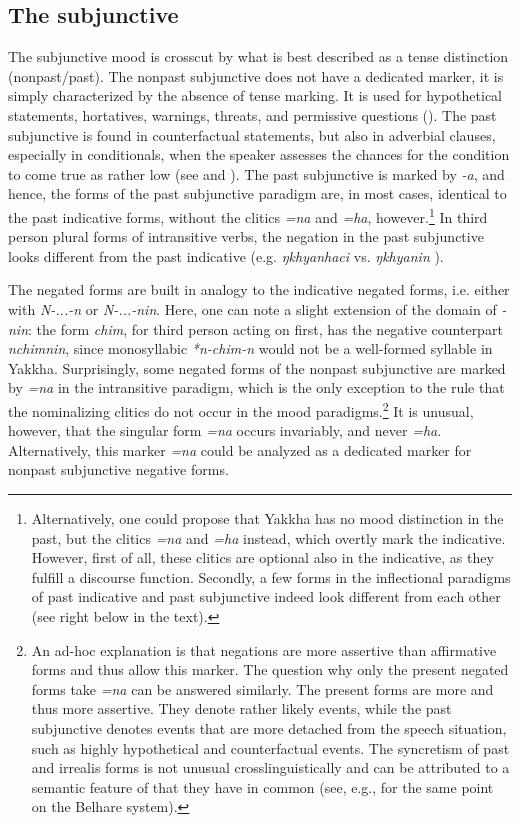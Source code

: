 \subsection{The subjunctive}

The subjunctive mood is crosscut by what is best described as a tense distinction (nonpast/past). The nonpast subjunctive does not have a dedicated marker, it is simply characterized by the absence of tense marking. It is used for hypothetical statements, hortatives, warnings, threats, and permissive questions (). The past subjunctive is found in counterfactual statements, but also in adverbial clauses, especially in conditionals, when the speaker assesses the chances for the condition to come true as rather low (see  and ). The past subjunctive is marked by \emph{-a}, and hence, the forms of the past subjunctive paradigm are, in most cases, identical to the past indicative forms, without the clitics \emph{=na} and \emph{=ha}, however.\footnote{Alternatively, one could propose that Yakkha has no mood distinction in the past, but the clitics  \emph{=na} and \emph{=ha} instead, which overtly mark the indicative. However, first of all, these clitics are optional also in the indicative, as they fulfill a discourse function. Secondly, a few forms in the inflectional paradigms of past indicative and past subjunctive indeed look different from each other (see right below in the text).} In third person plural forms of intransitive verbs, the negation in the past subjunctive looks different from the past indicative (e.g. \emph{ŋkhyanhaci}  vs. \emph{ŋkhyanin} ). 


The negated forms are built in analogy to the indicative negated forms, i.e. either with \emph{N-...-n} or \emph{N-...-nin}. Here, one can note a slight extension of the domain of \emph{-nin}: the form \emph{chim}, for third person acting on first, has the negative counterpart \emph{nchimnin}, since monosyllabic  \emph{*n-chim-n } would not be a well-formed syllable in Yakkha. Surprisingly, some negated forms of the nonpast subjunctive are marked by \emph{=na} in the intransitive paradigm, which is the only exception to the rule that the nominalizing clitics do not occur in the mood paradigms.\footnote{An ad-hoc explanation is that negations are more assertive than affirmative forms and thus allow this marker. The question why only the present negated forms take \emph{=na} can be answered similarly. The present forms are more  and thus more assertive. They denote rather likely events, while the past subjunctive denotes events that are more detached from the speech situation, such as highly hypothetical and counterfactual events. The syncretism of past and irrealis forms is not unusual crosslinguistically and can be attributed to a semantic feature of  that they have in common (see, e.g., \citet[88]{Bickel1996Aspect} for the same point on the Belhare system).}  It is unusual, however, that the singular form \emph{=na} occurs invariably, and never \emph{=ha}. Alternatively, this marker \emph{=na} could be analyzed as a dedicated marker for nonpast subjunctive negative forms.

